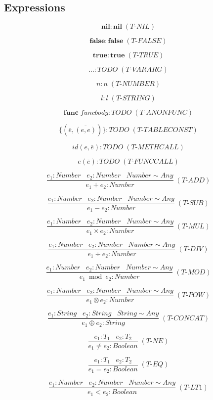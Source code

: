 \documentclass[12pt]{article}
\begin{document}
\subsection{Expressions}

\[
\textbf{nil} : \textbf{nil} \; (\textit{T-NIL})
\]

\[
\textbf{false} : \textbf{false} \; (\textit{T-FALSE})
\]

\[
\textbf{true} : \textbf{true} \; (\textit{T-TRUE})
\]

\[
{...} : TODO \; (\textit{T-VARARG})
\]

\[
n : n \; (\textit{T-NUMBER})
\]

\[
l : l \; (\textit{T-STRING})
\]

\[
\textbf{func} \; funcbody : TODO \; (\textit{T-ANONFUNC})
\]

\[
\{(\overline{e},\overline{(e,e)})\} : TODO \; (\textit{T-TABLECONST})
\]

\[
id(e,\overline{e}) : TODO \; (\textit{T-METHCALL})
\]

\[
e(\overline{e}) : TODO \; (\textit{T-FUNCCALL})
\]

\[
\frac{e_{1}:Number \;\;\; e_{2}:Number \;\;\; Number \sim Any}
     {e_{1} + e_{2} : Number} \; (\textit{T-ADD})
\]

\[
\frac{e_{1}:Number \;\;\; e_{2}:Number \;\;\; Number \sim Any}
     {e_{1} - e_{2} : Number} \; (\textit{T-SUB})
\]

\[
\frac{e_{1}:Number \;\;\; e_{2}:Number \;\;\; Number \sim Any}
     {e_{1} \times e_{2} : Number} \; (\textit{T-MUL})
\]

\[
\frac{e_{1}:Number \;\;\; e_{2}:Number \;\;\; Number \sim Any}
     {e_{1} \div e_{2} : Number} \; (\textit{T-DIV})
\]

\[
\frac{e_{1}:Number \;\;\; e_{2}:Number \;\;\; Number \sim Any}
     {e_{1} \bmod e_{2} : Number} \; (\textit{T-MOD})
\]

\[
\frac{e_{1}:Number \;\;\; e_{2}:Number \;\;\; Number \sim Any}
     {e_{1} \otimes e_{2} : Number} \; (\textit{T-POW})
\]

\[
\frac{e_{1}:String \;\;\; e_{2}:String \;\;\; String \sim Any}
     {e_{1} \oplus e_{2} : String} \; (\textit{T-CONCAT})
\]

\[
\frac{e_{1}:T_{1} \;\;\; e_{2}:T_{2}}
     {e_{1} \not= e_{2} : Boolean} \; (\textit{T-NE})
\]

\[
\frac{e_{1}:T_{1} \;\;\; e_{2}:T_{2}}
     {e_{1} = e_{2} : Boolean} \; (\textit{T-EQ})
\]

\[
\frac{e_{1}:Number \;\;\; e_{2}:Number \;\;\; Number \sim Any}
     {e_{1} < e_{2} : Boolean} \; (\textit{T-LT1})
\]
\end{document}
